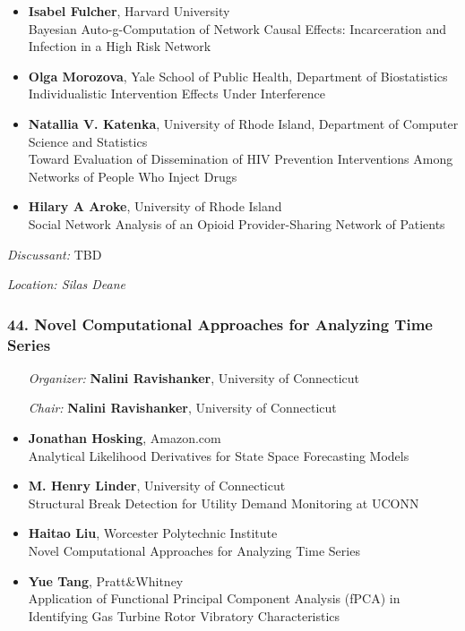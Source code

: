 \begin{itemize}
\item \textbf{Isabel Fulcher}, Harvard University \\
Bayesian Auto-g-Computation of Network Causal Effects: Incarceration and Infection in a High Risk Network
\item \textbf{Olga Morozova}, Yale School of Public Health, Department of Biostatistics \\
Individualistic Intervention Effects Under Interference
\item \textbf{Natallia V. Katenka}, University of Rhode Island, Department of Computer Science and Statistics \\
Toward Evaluation of Dissemination of HIV Prevention Interventions Among Networks of People Who Inject Drugs
\item \textbf{Hilary A Aroke}, University of Rhode Island \\
Social Network Analysis of an Opioid Provider-Sharing Network of Patients
\end{itemize}

\emph{Discussant:} TBD

\emph{Location: Silas Deane}

\subsubsection*{44. Novel Computational Approaches for Analyzing Time Series}

\begin{enumerate}[align=left]
\item [\emph{Organizer:}] \textbf{Nalini Ravishanker}, University of Connecticut
\item [\emph{Chair:}] \textbf{Nalini Ravishanker}, University of Connecticut
\end{enumerate}

\begin{itemize}
\item \textbf{Jonathan Hosking}, Amazon.com \\
Analytical Likelihood Derivatives for State Space Forecasting Models
\item \textbf{M. Henry Linder}, University of Connecticut \\
Structural Break Detection for Utility Demand Monitoring at UCONN
\item \textbf{Haitao Liu}, Worcester Polytechnic Institute \\
Novel Computational Approaches for Analyzing Time Series
\item \textbf{Yue Tang}, Pratt\&Whitney \\
Application of Functional Principal Component Analysis (fPCA) in Identifying Gas Turbine Rotor Vibratory Characteristics
\end{itemize}

